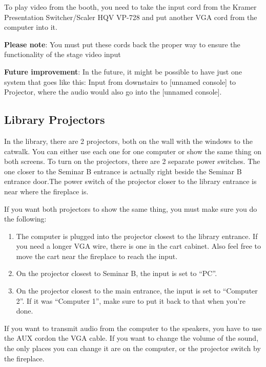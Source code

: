 \documentclass{article}
\begin{document}
To play video from the booth, you need to take the input cord from the Kramer Presentation Switcher/Scaler HQV VP-728 and put another VGA cord from the computer into it.

\textbf{Please note}: You must put these cords back the proper way to ensure the functionality of the stage video input

\textbf{Future improvement}: In the future, it might be possible to have just one system that goes like this: Input from downstairs to [unnamed console] to Projector, where the audio would also go into the [unnamed console].

\subsection{Library Projectors}
In the library, there are 2 projectors, both on the wall with the windows to the catwalk. You can either use each one for one computer or show the same thing on both screens. To turn on the projectors, there are 2 separate power switches. The one closer to the Seminar B entrance is actually right beside the Seminar B entrance door.The power switch of the projector closer to the library entrance is near where the fireplace is.

If you want both projectors to show the same thing, you must make sure you do the following:
\begin{enumerate}
    \item The computer is plugged into the projector closest to the library entrance. If you need a longer VGA wire, there is one in the cart cabinet. Also feel free to move the cart near the fireplace to reach the input.
    \item On the projector closest to Seminar B, the input is set to ``PC''.
    \item On the projector closest to the main entrance, the input is set to ``Computer 2''. If it was ``Computer 1'', make sure to put it back to that when you’re done.
\end{enumerate}

If you want to transmit audio from the computer to the speakers, you have to use the AUX cordon the VGA cable. If you want to change the volume of the sound, the only places you can change it are on the computer, or the projector switch by the fireplace.
\end{document}
